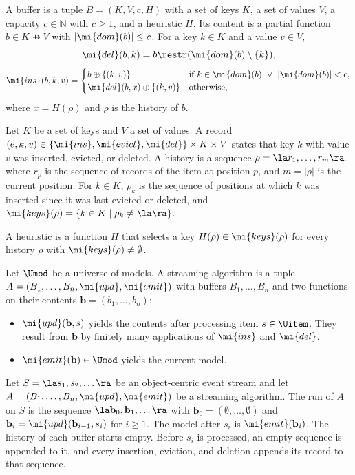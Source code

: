\begin{definition}[Buffer]
A buffer is a tuple $B = (K, V, c, H)$ with a set of keys $K$, a set of
values $V$, a capacity $c \in \mathbb{N}$ with $c \ge 1$, and a heuristic $H$.
Its content is a partial function $b \in K \pfun V$ with
$|\mi{dom}(b)| \le c$.
For a key $k \in K$ and a value $v \in V$,
\[
  \mi{del}(b, k) = b \restr (\mi{dom}(b) \setminus \{k\}),
\]
\[
  \mi{ins}(b, k, v) =
  \begin{cases}
    b \oplus \{(k, v)\} & \text{if } k \in \mi{dom}(b) \ \vee\ |\mi{dom}(b)| < c,\\
    \mi{del}(b, x) \oplus \{(k, v)\} & \text{otherwise,}
  \end{cases}
\]
where $x = H(\rho)$ and $\rho$ is the history of $b$.
\end{definition}

\begin{definition}
Let $K$ be a set of keys and $V$ a set of values.
A record $(e, k, v) \in \{\mi{ins}, \mi{evict}, \mi{del}\} \times K \times V$
states that key $k$ with value $v$ was inserted, evicted, or deleted.
A history is a sequence $\rho = \la r_1, \dots, r_m \ra$, where $r_p$ is the
sequence of records of the item at position $p$, and $m = |\rho|$ is the
current position.
For $k \in K$, $\rho_k$ is the sequence of positions at which $k$ was inserted
since it was last evicted or deleted, and
$\mi{keys}(\rho) = \{k \in K \mid \rho_k \neq \la \ra\}$.

A heuristic is a function $H$ that selects a key $H(\rho) \in \mi{keys}(\rho)$
for every history $\rho$ with $\mi{keys}(\rho) \neq \emptyset$.
\end{definition}

\begin{definition}
Let $\Umod$ be a universe of models.
A streaming algorithm is a tuple $A = (B_1, \dots, B_n, \mi{upd}, \mi{emit})$
with buffers $B_1, \dots, B_n$ and two functions on their contents
$\mathbf{b} = (b_1, \dots, b_n)$:
\begin{itemize}
  \item $\mi{upd}(\mathbf{b}, s)$ yields the contents after processing item
        $s \in \Uitem$.
        They result from $\mathbf{b}$ by finitely many applications of
        $\mi{ins}$ and $\mi{del}$.
  \item $\mi{emit}(\mathbf{b}) \in \Umod$ yields the current model.
\end{itemize}
\end{definition}

\begin{definition}[Run]
Let $S = \la s_1, s_2, \dots \ra$ be an object-centric event stream and let
$A = (B_1, \dots, B_n, \mi{upd}, \mi{emit})$ be a streaming algorithm.
The run of $A$ on $S$ is the sequence $\la \mathbf{b}_0, \mathbf{b}_1, \dots \ra$
with $\mathbf{b}_0 = (\emptyset, \dots, \emptyset)$ and
$\mathbf{b}_i = \mi{upd}(\mathbf{b}_{i-1}, s_i)$ for $i \ge 1$.
The model after $s_i$ is $\mi{emit}(\mathbf{b}_i)$.
The history of each buffer starts empty.
Before $s_i$ is processed, an empty sequence is appended to it, and every
insertion, eviction, and deletion appends its record to that sequence.
\end{definition}
